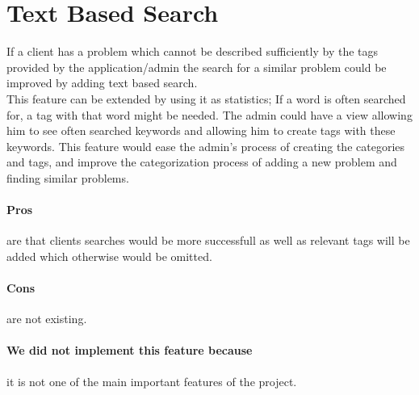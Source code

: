\section{Text Based Search}
\label{sec:text_based_search}
If a client has a problem which cannot be described sufficiently by the tags provided by the application/admin the search for a similar problem could be improved by adding text based search. \\
This feature can be extended by using it as statistics; If a word is often searched for, a tag with that word might be needed. 
The admin could have a view allowing him to see often searched keywords and allowing him to create tags with these keywords.
This feature would ease the admin's process of creating the categories and tags, and improve the categorization process of adding a new problem and finding similar problems.

\paragraph{Pros} are that clients searches would be more successfull as well as relevant tags will be added which otherwise would be omitted.
\paragraph{Cons} are not existing.
\paragraph{We did not implement this feature because} it is not one of the main important features of the project. 